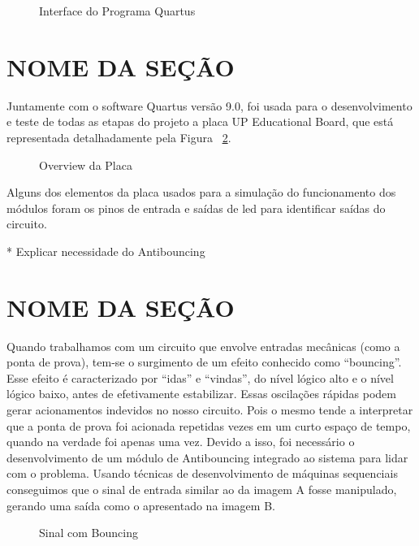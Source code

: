 \documentclass[12pt,a4paper,openany]{abntex2}
\begin{document}
\begin{figure}[!htp]
	\centering
	\caption{Interface do Programa Quartus}
	\label{fig:interface-quartus}
\end{figure}

\section{NOME DA SEÇÃO}

Juntamente com o software Quartus versão 9.0, foi usada para o desenvolvimento e teste
de todas as etapas do projeto a placa UP Educational Board, que está representada
detalhadamente pela Figura ~\ref{fig:placa-1}.

\begin{figure}[!htp]
	\centering
	\caption{Overview da Placa}
	\label{fig:placa-1}
\end{figure}

Alguns dos elementos da placa usados para a simulação do funcionamento dos módulos
foram os pinos de entrada e saídas de led para identificar saídas do circuito.

* Explicar necessidade do Antibouncing
\section{NOME DA SEÇÃO}

Quando trabalhamos com um circuito que envolve entradas mecânicas (como a ponta de prova),
tem-se o surgimento de um efeito conhecido como “bouncing”.
Esse efeito é caracterizado por “idas” e “vindas”, do nível lógico alto e o nível
lógico baixo, antes de efetivamente estabilizar. Essas oscilações rápidas podem
gerar acionamentos indevidos no nosso circuito. Pois o mesmo tende a interpretar
que a ponta de prova foi acionada repetidas vezes em um curto espaço de tempo,
quando na verdade foi apenas uma vez.
Devido a isso, foi necessário o desenvolvimento de um módulo de Antibouncing
integrado ao sistema para lidar com o problema. Usando técnicas de desenvolvimento
de máquinas sequenciais conseguimos que o sinal de entrada similar ao da imagem A
fosse manipulado, gerando uma saída como o apresentado na imagem B.

\begin{figure}[!htp]
	\centering
	\caption{Sinal com Bouncing}
	\label{fig:sinal-com-bouncing}
\end{figure}
\end{document}
